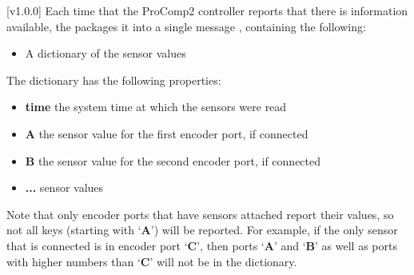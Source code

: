 [v1.0.0]
Each time that the ProComp2 controller reports that there is information available,
the  packages it into a single message
\openSq{}\closeSq, containing the following:
\begin{itemize}
\item A dictionary \openSq{}\closeSq{} of the sensor values 
\end{itemize}

The dictionary has the following properties:
\begin{itemize}
\item\textbf{time} \longDash{} the system time at which the sensors were read
\item\exSp\textbf{A} \longDash{} the sensor value for the first encoder port, if
connected
\item\exSp\textbf{B} \longDash{} the sensor value for the second encoder port, if
connected
\item\exSp\textbf{...} \longDash{} sensor values
\end{itemize}
Note that only encoder ports that have sensors attached report their values, so not all
keys (starting with `\textbf{A}') will be reported.
For example, if the only sensor that is connected is in encoder port `\textbf{C}', then
ports `\textbf{A}' and `\textbf{B}' as well as ports with higher numbers than `\textbf{C}'
will not be in the dictionary.
\primaryEnd{}
